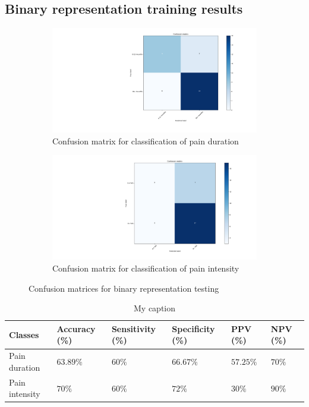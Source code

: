 \documentclass[12pt,a4paper]{article}
\begin{document}
\subsection{Binary representation training results}

\begin{figure}[H]
  \begin{subfigure}[b]{0.45\textwidth}
    \includegraphics[width=\textwidth]{figures/bdura2cla}
    \caption{Confusion matrix for classification of pain duration}
    \label{fig:f11}
  \end{subfigure}
  \hfill
  \begin{subfigure}[b]{0.45\textwidth}
    \includegraphics[width=\textwidth]{figures/bpain2cla}
    \caption{Confusion matrix for classification of pain intensity}
    \label{fig:f22}
  \end{subfigure}
  \caption{Confusion matrices for binary representation testing}
\end{figure}



\begin{table}[H]
\centering
\begin{tabular}{|p{2cm}|p{2.2cm}|p{2.2cm}|p{2.2cm}|p{2cm}|p{2cm}|}
\hline
Classes          & Accuracy (\%) & Sensitivity (\%) & Specificity (\%) & PPV (\%) & NPV (\%) \\ \hline
Pain duration &$63.89\%$&$60\%$&$66.67\%$&$57.25\%$&$70\%$\\ \hline
Pain intensity &$70\%$&$60\%$&$72\%$&$30\%$&$90\%$ \\ \hline
\end{tabular}
\label{my-label}
\caption{My caption}
\end{table}
\end{document}
